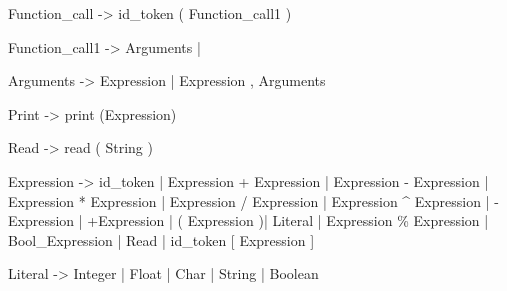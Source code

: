 Function_call -> id_token ( Function_call1 )

Function_call1 -> Arguments | \epsilon

Arguments -> Expression | Expression , Arguments

Print -> print (Expression)

Read -> read ( String )

Expression -> id_token | Expression + Expression | Expression - Expression | Expression * Expression | Expression / Expression | Expression ^ Expression | -Expression | +Expression | ( Expression )| Literal | Expression \% Expression | Bool_Expression | Read | id_token [ Expression ] %


Literal -> Integer | Float | Char | String | Boolean

